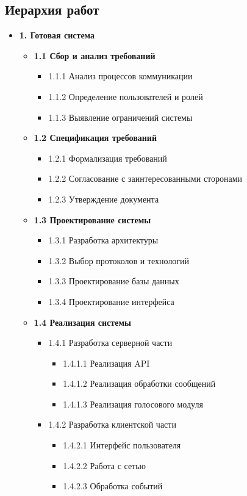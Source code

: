 \documentclass[14pt,a4paper]{extarticle}
\begin{document}
\subsection*{Иерархия работ}

\begin{itemize}
\item \textbf{1. Готовая система}
\begin{itemize}
\item \textbf{1.1 Сбор и анализ требований}
\begin{itemize}
\item 1.1.1 Анализ процессов коммуникации
\item 1.1.2 Определение пользователей и ролей
\item 1.1.3 Выявление ограничений системы
\end{itemize}

    \item \textbf{1.2 Спецификация требований}
    \begin{itemize}
        \item 1.2.1 Формализация требований
        \item 1.2.2 Согласование с заинтересованными сторонами
        \item 1.2.3 Утверждение документа
    \end{itemize}

    \item \textbf{1.3 Проектирование системы}
    \begin{itemize}
        \item 1.3.1 Разработка архитектуры
        \item 1.3.2 Выбор протоколов и технологий
        \item 1.3.3 Проектирование базы данных
        \item 1.3.4 Проектирование интерфейса
    \end{itemize}

    \item \textbf{1.4 Реализация системы}
    \begin{itemize}
        \item 1.4.1 Разработка серверной части
        \begin{itemize}
            \item 1.4.1.1 Реализация API
            \item 1.4.1.2 Реализация обработки сообщений
            \item 1.4.1.3 Реализация голосового модуля
        \end{itemize}
        \item 1.4.2 Разработка клиентской части
        \begin{itemize}
            \item 1.4.2.1 Интерфейс пользователя
            \item 1.4.2.2 Работа с сетью
            \item 1.4.2.3 Обработка событий
        \end{itemize}
    \end{itemize}


\end{itemize}
\end{itemize}
\end{document}
